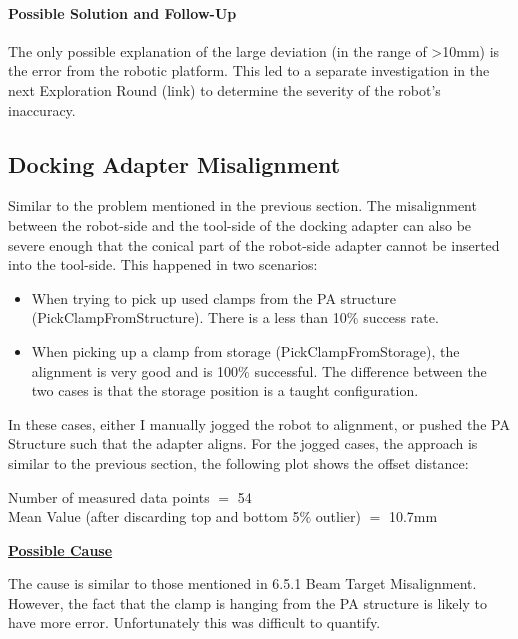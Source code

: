 {\begin{itemize}
\begin{itemize}
\end{itemize}
\end{itemize}

\paragraph{Possible Solution and Follow-Up}

The only possible explanation of the large deviation (in the range of >10mm) is the error from the robotic platform. This led to a separate investigation in the next Exploration Round (link) to determine the severity of the robot’s inaccuracy.

\subsection{Docking Adapter Misalignment}
\label{subsection:exploration_3_docking_adapter_misalignment}

Similar to the problem mentioned in the previous section. The misalignment between the robot-side and the tool-side of the docking adapter can also be severe enough that the conical part of the robot-side adapter cannot be inserted into the tool-side. This happened in two scenarios:

\begin{itemize}
	\item When trying to pick up used clamps from the PA structure (PickClampFromStructure). There is a less than 10$\%$ success rate.

	\item When picking up a clamp from storage (PickClampFromStorage), the alignment is very good and is 100$\%$ successful. The difference between the two cases is that the storage position is a taught configuration.

\end{itemize}
In these cases, either I manually jogged the robot to alignment, or pushed the PA Structure such that the adapter aligns. For the jogged cases, the approach is similar to the previous section, the following plot shows the offset distance:


{\footnotesize Number of measured data points $=$ 54 \\ Mean Value (after discarding top and bottom 5$\%$ outlier) $=$ 10.7mm}

\textbf{\ul{Possible Cause}}

The cause is similar to those mentioned in 6.5.1 Beam Target Misalignment. However, the fact that the clamp is hanging from the PA structure is likely to have more error. Unfortunately this was difficult to quantify. 

}
